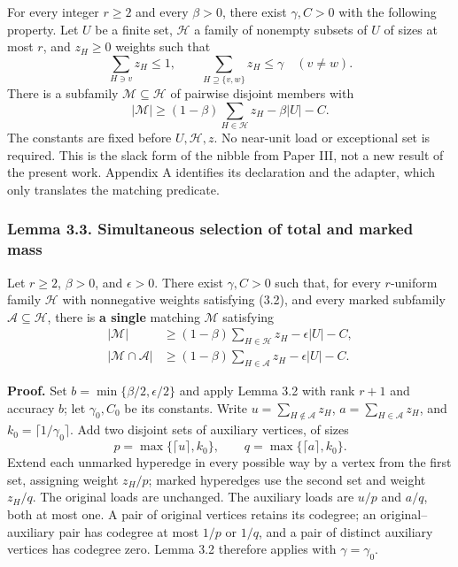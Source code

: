\documentclass[english,11pt,a4paper]{article}
\newcounter{none}
\begin{document}
For every integer \(r\ge2\) and every \(\beta>0\), there exist \(\gamma,C>0\) with the following property. Let \(U\) be a finite set, \(\mathcal H\) a family of nonempty subsets of \(U\) of sizes at most \(r\), and \(z_H\ge0\) weights such that \[
\sum_{H\ni v}z_H\le1,\qquad
\sum_{H\supseteq\{v,w\}}z_H\le\gamma\quad(v\ne w).
\tag{3.2}
\] There is a subfamily \(\mathcal M\subseteq\mathcal H\) of pairwise disjoint members with \[
|\mathcal M|\ge(1-\beta)\sum_{H\in\mathcal H}z_H-\beta|U|-C.
\tag{3.3}
\] The constants are fixed before \(U,\mathcal H,z\). No near-unit load or exceptional set is required. This is the slack form of the nibble from Paper III, not a new result of the present work. Appendix A identifies its declaration and the adapter, which only translates the matching predicate.

\subsubsection{Lemma 3.3. Simultaneous selection of total and marked mass}\label{lemma-3.3.-simultaneous-selection-of-total-and-marked-mass}

Let \(r\ge2\), \(\beta>0\), and \(\epsilon>0\). There exist \(\gamma,C>0\) such that, for every \(r\)-uniform family \(\mathcal H\) with nonnegative weights satisfying (3.2), and every marked subfamily \(\mathcal A\subseteq\mathcal H\), there is \textbf{a single} matching \(\mathcal M\) satisfying \[
\begin{aligned}
|\mathcal M|&\ge(1-\beta)\sum_{H\in\mathcal H}z_H-\epsilon|U|-C,\\
|\mathcal M\cap\mathcal A|&\ge(1-\beta)\sum_{H\in\mathcal A}z_H-\epsilon|U|-C.
\end{aligned}
\tag{3.4}
\]

\textbf{Proof.} Set \(b=\min\{\beta/2,\epsilon/2\}\) and apply Lemma 3.2 with rank \(r+1\) and accuracy \(b\); let \(\gamma_0,C_0\) be its constants. Write \(u=\sum_{H\notin\mathcal A}z_H\), \(a=\sum_{H\in\mathcal A}z_H\), and \(k_0=\lceil1/\gamma_0\rceil\). Add two disjoint sets of auxiliary vertices, of sizes \[
p=\max\{\lceil u\rceil,k_0\},\qquad
q=\max\{\lceil a\rceil,k_0\}.
\] Extend each unmarked hyperedge in every possible way by a vertex from the first set, assigning weight \(z_H/p\); marked hyperedges use the second set and weight \(z_H/q\). The original loads are unchanged. The auxiliary loads are \(u/p\) and \(a/q\), both at most one. A pair of original vertices retains its codegree; an original--auxiliary pair has codegree at most \(1/p\) or \(1/q\), and a pair of distinct auxiliary vertices has codegree zero. Lemma 3.2 therefore applies with \(\gamma=\gamma_0\).
\end{document}
